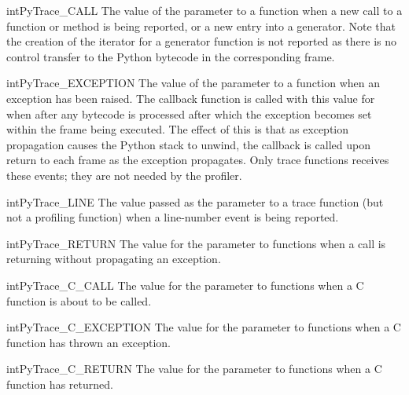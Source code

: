 \begin{cvardesc}{int}{PyTrace_CALL}
  The value of the  parameter to a 
  function when a new call to a function or method is being reported,
  or a new entry into a generator.  Note that the creation of the
  iterator for a generator function is not reported as there is no
  control transfer to the Python bytecode in the corresponding frame.
\end{cvardesc}

\begin{cvardesc}{int}{PyTrace_EXCEPTION}
  The value of the  parameter to a 
  function when an exception has been raised.  The callback function
  is called with this value for  when after any bytecode is
  processed after which the exception becomes set within the frame
  being executed.  The effect of this is that as exception propagation
  causes the Python stack to unwind, the callback is called upon
  return to each frame as the exception propagates.  Only trace
  functions receives these events; they are not needed by the
  profiler.
\end{cvardesc}

\begin{cvardesc}{int}{PyTrace_LINE}
  The value passed as the  parameter to a trace function
  (but not a profiling function) when a line-number event is being
  reported.
\end{cvardesc}

\begin{cvardesc}{int}{PyTrace_RETURN}
  The value for the  parameter to 
  functions when a call is returning without propagating an exception.
\end{cvardesc}

\begin{cvardesc}{int}{PyTrace_C_CALL}
  The value for the  parameter to 
  functions when a C function is about to be called.
\end{cvardesc}

\begin{cvardesc}{int}{PyTrace_C_EXCEPTION}
  The value for the  parameter to 
  functions when a C function has thrown an exception.
\end{cvardesc}

\begin{cvardesc}{int}{PyTrace_C_RETURN}
  The value for the  parameter to 
  functions when a C function has returned.
\end{cvardesc}

